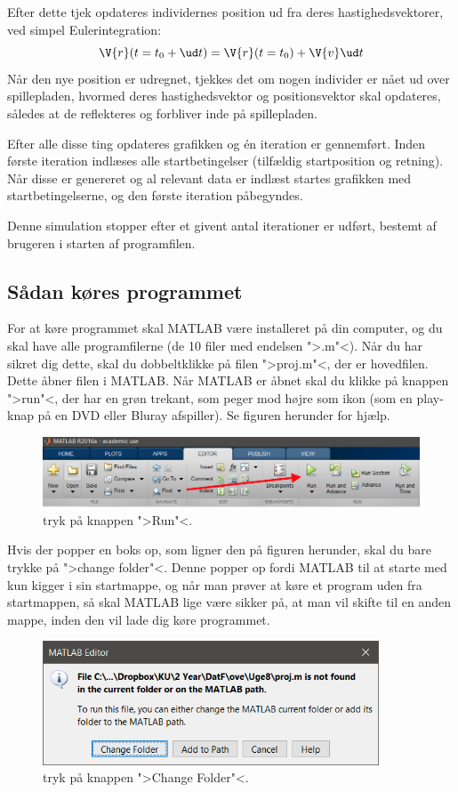 \documentclass[a4paper,10pt]{article} 	%
\numberwithin{equation}{section}
\begin{document}
	Efter dette tjek opdateres individernes position ud fra deres hastighedsvektorer, ved simpel Eulerintegration:
	\begin{equation*}
		\V{r}(t = t_0+ \ud t) = \V{r}(t=t_0) + \V{v} \ud t
	\end{equation*}
	Når den nye position er udregnet, tjekkes det om nogen individer er nået ud over spillepladen, hvormed deres hastighedsvektor og positionsvektor skal opdateres, således at de reflekteres og forbliver inde på spillepladen.
	
	Efter alle disse ting opdateres grafikken og én iteration er gennemført. Inden første iteration indlæses alle startbetingelser (tilfældig startposition og retning). Når disse er genereret og al relevant data er indlæst startes grafikken med startbetingelserne, og den første iteration påbegyndes.
	
	Denne simulation stopper efter et givent antal iterationer er udført, bestemt af brugeren i starten af programfilen.
	
	\subsection{Sådan køres programmet}
	For at køre programmet skal MATLAB være installeret på din computer, og du skal have alle programfilerne (de 10 filer med endelsen ">.m"<). Når du har sikret dig dette, skal du dobbeltklikke på filen ">proj.m"<, der er hovedfilen. Dette åbner filen i MATLAB. Når MATLAB er åbnet skal du klikke på knappen ">run"<, der har en grøn trekant, som peger mod højre som ikon (som en play-knap på en DVD eller Bluray afspiller). Se figuren herunder for hjælp.
	\begin{figure}[H]
		\centering
		\includegraphics[width=\textwidth]{img/run.png}
		\caption{tryk på knappen ">Run"<.}
		\label{fig:run}
	\end{figure}
	
	Hvis der popper en boks op, som ligner den på figuren herunder, skal du bare trykke på ">change folder"<. Denne popper op fordi MATLAB til at starte med kun kigger i sin startmappe, og når man prøver at køre et program uden fra startmappen, så skal MATLAB lige være sikker på, at man vil skifte til en anden mappe, inden den vil lade dig køre programmet.
	\begin{figure}[H]
		\centering
		\includegraphics[width=10cm]{img/folder.png}
		\caption{tryk på knappen ">Change Folder"<.}
		\label{fig:folder}
	\end{figure}
	
\end{document}
